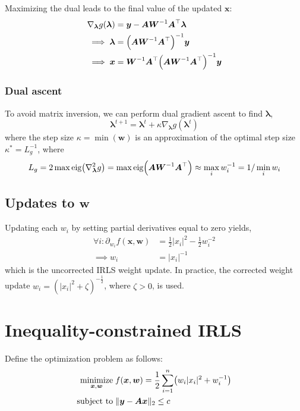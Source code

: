 \documentclass{article}
\numberwithin{equation}{section}
\newcommand{\lh}{\mathopen{}\mathclose\bgroup\left}
\newcommand{\rh}{\aftergroup\egroup\right}
\newcommand{\m}[1]{\boldsymbol{#1}}
\begin{document}
Maximizing the dual leads to the final value of the updated $\m{x}$:
\begin{equation}
\begin{aligned}
\nabla_{\m{\lambda}} g(\m{\lambda}) &=
 \m{y} - \m{A} \m{W}^{-1} \m{A}^\top \m{\lambda}
\\ \implies
 \m{\lambda} &= \lh( \m{A} \m{W}^{-1} \m{A}^\top \rh)^{-1} \m{y}
\\ \implies
 \m{x} &= \m{W}^{-1} \m{A}^\top
 \lh( \m{A} \m{W}^{-1} \m{A}^\top \rh)^{-1} \m{y}
\end{aligned}
\end{equation}

\subsubsection{Dual ascent}
To avoid matrix inversion, we can perform dual gradient ascent
to find $\m{\lambda}$,
\begin{equation}
\m{\lambda}^{t+1} =
 \m{\lambda}^t + \kappa \nabla_{\m{\lambda}} g(\m{\lambda}^t)
\end{equation}
where the step size $\kappa = \min(\m{w})$ is an approximation of the
optimal step size $\kappa^* = L_g^{-1}$, where
\begin{equation}
L_g =
 2 \max\text{eig}\lh( \nabla_{\m{\lambda}}^2 g \rh) =
 \max\text{eig}\lh( \m{A} \m{W}^{-1} \m{A}^\top \rh) \approx
 \max_i w_i^{-1} = 1 / \min_i w_i
\end{equation}

\subsection{Updates to $\m{w}$}
Updating each $w_i$ by setting partial derivatives equal to zero yields,
\begin{equation}
\begin{aligned}
\forall i:
\partial_{w_i} f(\m{x}, \m{w}) &=
 \frac{1}{2} |x_i|^2 - \frac{1}{2} w_i^{-2}
\\ \implies
 w_i &= |x_i|^{-1}
\end{aligned}
\end{equation}
which is the uncorrected IRLS weight update.
In practice, the corrected weight update
$w_i = (|x_i|^2 + \zeta)^{-\frac{1}{2}}$, where $\zeta > 0$, is
used.

\clearpage
\section{Inequality-constrained IRLS}
\label{s:irls_ic}
Define the optimization problem as follows:
\begin{equation}
\begin{aligned}
\underset{\m{x}, \m{w}}{\text{minimize}} &\; f(\m{x}, \m{w}) =
 \frac{1}{2} \sum_{i=1}^n \lh( w_i |x_i|^2 + w_i^{-1} \rh)
\\
\text{subject to} &\; \| \m{y} - \m{A} \m{x} \|_2 \le c
\end{aligned}
\end{equation}
\end{document}
